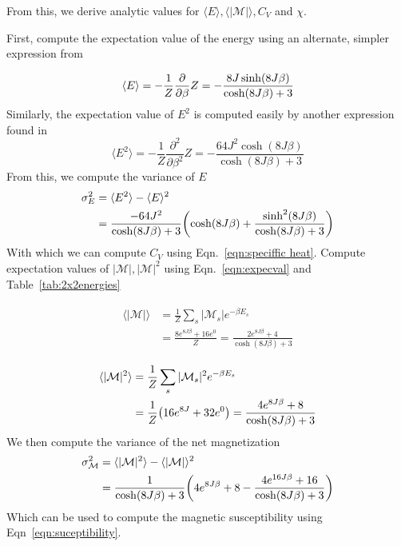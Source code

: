 \documentclass[10pt,showpacs,preprintnumbers,amsmath,amssymb,nofootinbib,aps,prl,twocolumn,groupedaddress,superscriptaddress,showkeys]{revtex4-1}
\begin{document}
    From this, we derive analytic values for $\langle E \rangle, \langle |\mathcal M| \rangle , C_V$ and $\chi$. 

    First, compute the expectation value of the energy using an alternate, simpler expression from \textcite[Ch~6.2]{schroeder}

    \begin{equation}
      \langle E \rangle = -\frac{1}{Z}\pderivative{\beta}Z = -\frac{8J\sinh(8J\beta)}{\cosh(8J\beta) + 3}
    \end{equation}
    Similarly, the expectation value of $E^2$ is computed easily by another expression found in \textcite[Ch~6.2]{schroeder}
    \begin{equation}
      \langle E^2 \rangle = -\frac{1}{Z}\frac{\partial^2}{\partial\beta^2}Z = - \frac{64J^2 \cosh(8J\beta)}{\cosh(8J\beta) + 3}
    \end{equation}
    From this, we compute the variance of $E$
    \begin{align}
      \begin{split}
        \sigma_E^2 &= \langle E^2 \rangle - \langle E \rangle ^2 
          \\
        &= \frac{-64J^2}{\cosh(8J\beta)+3} \qty(\cosh(8J\beta) + \frac{\sinh^2(8J \beta)}{\cosh(8J\beta) + 3})
      \end{split}
    \end{align}
    With which we can compute $C_V$ using Eqn.~\ref{eqn:speciffic heat}. Compute expectation values of $|\mathcal M|, |\mathcal M|^2$ using Eqn.~\ref{eqn:expecval} and Table~\ref{tab:2x2energies}

    \begin{align}
      \begin{split}
        \langle |\mathcal M | \rangle &= \frac{1}{Z} \sum_s |\mathcal M_s | e^{-\beta E_s} 
          \\
        &= \frac{8e^{8J\beta} + 16e^0}{Z} = \frac{2e^{8J\beta} + 4}{\cosh(8J\beta) + 3}
      \end{split}
    \end{align}

    \begin{align}
      \begin{split}
        \langle |\mathcal M |^2 \rangle &= \frac{1}{Z}\sum_s|\mathcal M_s|^2e^{-\beta E_s} 
          \\
        &= \frac{1}{Z}\qty(16e^{8J} + 32e^{0}) = \frac{4e^{8J\beta} + 8}{\cosh(8J\beta) + 3}
      \end{split}
    \end{align}
    We then compute the variance of the net magnetization
    \begin{align}
      \begin{split}
        \sigma_{\mathcal M}^2 &= \langle |\mathcal M|^2\rangle - \langle |\mathcal M|\rangle^2
          \\
        &= \frac{1}{\cosh(8J\beta) + 3}\qty(4e^{8J\beta} + 8 - \frac{4e^{16J\beta}+16}{\cosh(8J\beta) + 3})
      \end{split}
    \end{align}
    Which can be used to compute the magnetic susceptibility using Eqn~\ref{eqn:suceptibility}.
\end{document}
